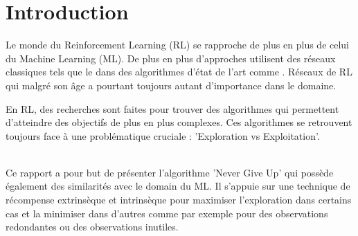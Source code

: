 \section{Introduction}

Le monde du Reinforcement Learning (RL) se rapproche de plus en plus de celui du Machine Learning (ML). De plus en plus d'approches utilisent des réseaux classiques tels que le  dans des algorithmes d'état de l'art comme . Réseaux de RL qui malgré son âge a pourtant toujours autant d'importance dans le domaine.

En RL, des recherches sont faites pour trouver des algorithmes qui permettent d'atteindre des objectifs de plus en plus complexes. Ces algorithmes se retrouvent toujours face à une problématique cruciale : 'Exploration vs Exploitation'.

~\\
Ce rapport a pour but de présenter l'algorithme 'Never Give Up'  qui possède également des similarités avec le domain du ML. Il s'appuie sur une technique de récompense extrinsèque et intrinsèque pour maximiser l'exploration dans certains cas et la minimiser dans d'autres comme par exemple pour des observations redondantes ou des observations inutiles.